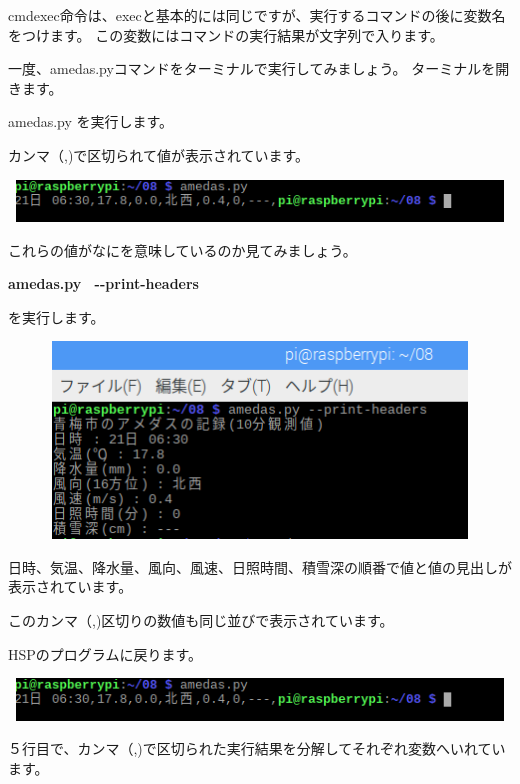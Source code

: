 \documentclass[a4paper,12pt,dvipdfmx]{jarticle}
\begin{document}
cmdexec命令は、execと基本的には同じですが、実行するコマンドの後に変数名をつけます。
この変数にはコマンドの実行結果が文字列で入ります。

一度、amedas.pyコマンドをターミナルで実行してみましょう。
ターミナルを開きます。

amedas.py を実行します。

カンマ（,)で区切られて値が表示されています。

\begin{center}
\includegraphics[width=17.006cm,height=1.122cm]{textbook-img032-1.png}

\end{center}
これらの値がなにを意味しているのか見てみましょう。

\textbf{amedas.py \ {}-{}-print-headers}

を実行します。



\begin{center}
\includegraphics[width=17.006cm,height=5.237cm]{textbook-img032-2.png}

\end{center}
日時、気温、降水量、風向、風速、日照時間、積雪深の順番で値と値の見出しが表示されています。

このカンマ（,)区切りの数値も同じ並びで表示されています。

HSPのプログラムに戻ります。

\begin{center}
\includegraphics[width=17.006cm,height=1.122cm]{textbook-img032-1.png}

\end{center}
５行目で、カンマ（,)で区切られた実行結果を分解してそれぞれ変数へいれています。
\end{document}
